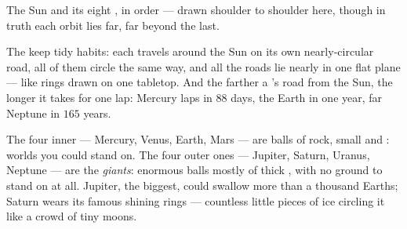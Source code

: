 \begin{omfigure}

{\small The Sun and its eight , in order --- drawn shoulder
to shoulder here, though in truth each orbit lies far, far beyond
the last.}
\end{omfigure}

\begin{proposition}\label{prop:g4:solar-system:habits}
The  keep tidy habits: each travels around the Sun on its
own nearly-circular road, all of them circle the same way, and all
the roads lie nearly in one flat plane --- like rings drawn on one
tabletop. And the farther a 's road from the Sun, the longer
it takes for one lap: Mercury laps in $88$ days, the Earth in one
year, far Neptune in $165$ years.
\end{proposition}

\begin{example}\label{ex:g4:solar-system:kinds}
The four inner  --- Mercury, Venus, Earth, Mars --- are
balls of rock, small and : worlds you could stand on. The four
outer ones --- Jupiter, Saturn, Uranus, Neptune --- are the
\emph{giants}: enormous balls mostly of thick , with no ground
to stand on at all. Jupiter, the biggest, could swallow more than a
thousand Earths; Saturn wears its famous shining rings --- countless
little pieces of ice circling it like a crowd of tiny moons.
\end{example}

